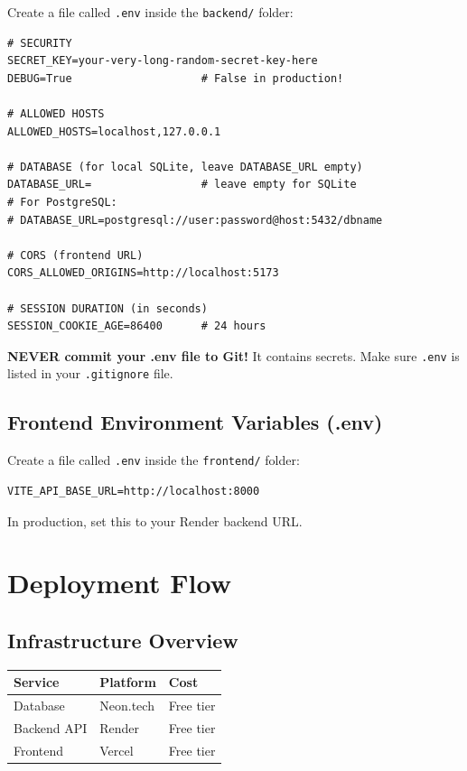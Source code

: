 \documentclass[12pt,a4paper]{article}
\begin{document}
Create a file called \texttt{.env} inside the \texttt{backend/} folder:

\begin{lstlisting}
# SECURITY
SECRET_KEY=your-very-long-random-secret-key-here
DEBUG=True                    # False in production!

# ALLOWED HOSTS
ALLOWED_HOSTS=localhost,127.0.0.1

# DATABASE (for local SQLite, leave DATABASE_URL empty)
DATABASE_URL=                 # leave empty for SQLite
# For PostgreSQL:
# DATABASE_URL=postgresql://user:password@host:5432/dbname

# CORS (frontend URL)
CORS_ALLOWED_ORIGINS=http://localhost:5173

# SESSION DURATION (in seconds)
SESSION_COOKIE_AGE=86400      # 24 hours
\end{lstlisting}

\begin{warnbox}
\textbf{NEVER commit your .env file to Git!} It contains secrets. Make sure \texttt{.env} is listed in your \texttt{.gitignore} file.
\end{warnbox}

\subsection{Frontend Environment Variables (.env)}

Create a file called \texttt{.env} inside the \texttt{frontend/} folder:

\begin{lstlisting}
VITE_API_BASE_URL=http://localhost:8000
\end{lstlisting}

In production, set this to your Render backend URL.


\section{Deployment Flow}

\subsection{Infrastructure Overview}

\begin{center}
\begin{tabular}{lll}
\toprule
\textbf{Service} & \textbf{Platform} & \textbf{Cost} \\
\midrule
Database & Neon.tech & Free tier \\
Backend API & Render & Free tier \\
Frontend & Vercel & Free tier \\
\bottomrule
\end{tabular}
\end{center}
\end{document}
